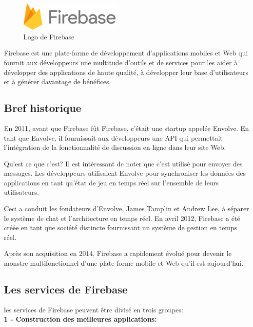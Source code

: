 \begin{figure}
	\includegraphics[width=5cm]{Images/chapter2/firebase_logo.png}
	\vspace{-20pt}
	\caption{{\footnotesize Logo de Firebase}}
\end{figure}

Firebase est une plate-forme de développement d'applications mobiles et Web qui fournit aux développeurs une multitude d'outils et de services pour les aider à développer des applications de haute qualité, à développer leur base d'utilisateurs et à générer davantage de bénéfices.\cite{geekyants_introduction_2017}

\subsection{Bref historique}
En 2011, avant que Firebase fût Firebase, c'était une startup appelée Envolve. En tant que Envolve, il fournissait aux développeurs une \gls{API} qui permettait l'intégration de la fonctionnalité de discussion en ligne dans leur site Web.

Qu'est ce que c'est? Il est intéressant de noter que c'est utilisé pour envoyer des messages. Les développeurs utilisaient Envolve pour synchroniser les données des applications en tant qu'état de jeu en temps réel sur l'ensemble de leurs utilisateurs.

Ceci a conduit les fondateurs d’Envolve, James Tamplin et Andrew Lee, à séparer le système de chat et l’architecture en temps réel. En avril 2012, Firebase a été créée en tant que société distincte fournissant un système de gestion en temps réel.

Après son acquisition en 2014, Firebase a rapidement évolué pour devenir le monstre multifonctionnel d’une plate-forme mobile et Web qu’il est aujourd’hui.

\subsection{Les services de Firebase}
les services de Firebase peuvent être divisé en trois groupes:\bigskip\\
\longtab \textbf{1 - Construction des meilleures applications:}\bigskip

